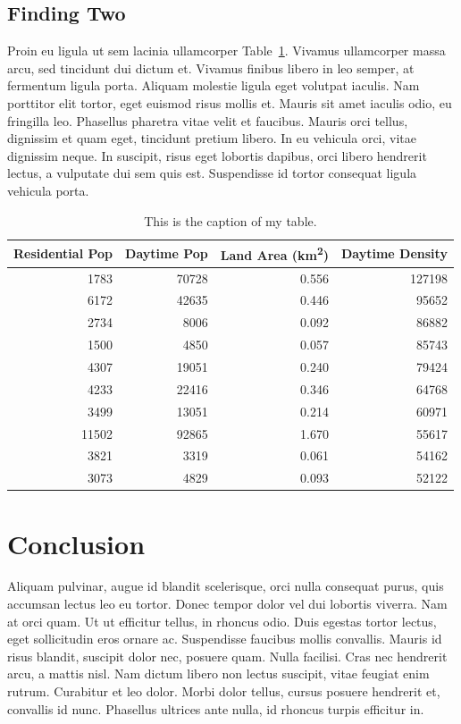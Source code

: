 \documentclass[12pt,letterpaper]{article} %
\begin{document}
\subsection{Finding Two}

Proin eu ligula ut sem lacinia ullamcorper Table~\ref{tab:my_table}. Vivamus ullamcorper massa arcu, sed tincidunt dui dictum et. Vivamus finibus libero in leo semper, at fermentum ligula porta. Aliquam molestie ligula eget volutpat iaculis. Nam porttitor elit tortor, eget euismod risus mollis et. Mauris sit amet iaculis odio, eu fringilla leo. Phasellus pharetra vitae velit et faucibus. Mauris orci tellus, dignissim et quam eget, tincidunt pretium libero. In eu vehicula orci, vitae dignissim neque. In suscipit, risus eget lobortis dapibus, orci libero hendrerit lectus, a vulputate dui sem quis est. Suspendisse id tortor consequat ligula vehicula porta.

\begin{table}[tbp]
    \centering
    \caption{This is the caption of my table.}\label{tab:my_table}
    \begin{tabular}{rrrr}
        \toprule
        Residential Pop &  Daytime Pop &  Land Area (km\textsuperscript{2}) &  Daytime Density \\
        \midrule
        1783  & 70728 & 0.556 & 127198 \\
        6172  & 42635 & 0.446 &  95652 \\
        2734  &  8006 & 0.092 &  86882 \\
        1500  &  4850 & 0.057 &  85743 \\
        4307  & 19051 & 0.240 &  79424 \\
        4233  & 22416 & 0.346 &  64768 \\
        3499  & 13051 & 0.214 &  60971 \\
        11502 & 92865 & 1.670 &  55617 \\
        3821  &  3319 & 0.061 &  54162 \\
        3073  &  4829 & 0.093 &  52122 \\
        \bottomrule
    \end{tabular}
\end{table}

\section{Conclusion}

Aliquam pulvinar, augue id blandit scelerisque, orci nulla consequat purus, quis accumsan lectus leo eu tortor. Donec tempor dolor vel dui lobortis viverra. Nam at orci quam. Ut ut efficitur tellus, in rhoncus odio. Duis egestas tortor lectus, eget sollicitudin eros ornare ac. Suspendisse faucibus mollis convallis. Mauris id risus blandit, suscipit dolor nec, posuere quam. Nulla facilisi. Cras nec hendrerit arcu, a mattis nisl. Nam dictum libero non lectus suscipit, vitae feugiat enim rutrum. Curabitur et leo dolor. Morbi dolor tellus, cursus posuere hendrerit et, convallis id nunc. Phasellus ultrices ante nulla, id rhoncus turpis efficitur in.
\end{document}
